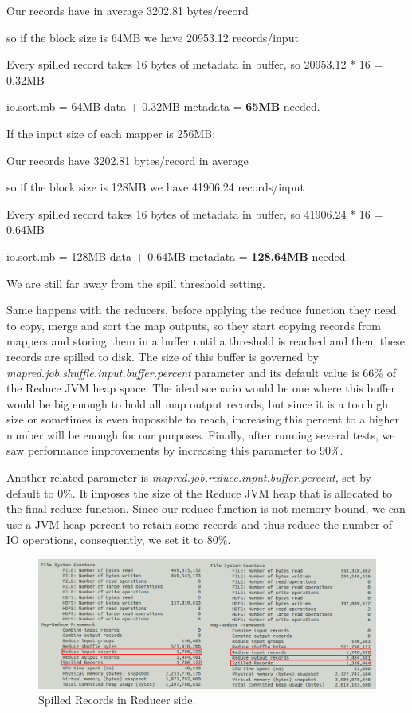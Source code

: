 \begin{itemize}
\centerline{Our records have in average 3202.81 bytes/record}
\centerline{so if the block size is 64MB we have 20953.12 records/input}
\centerline{Every spilled record takes 16 bytes of metadata in buffer, so 20953.12 * 16 = 0.32MB}
\centerline{io.sort.mb = 64MB data + 0.32MB metadata = \textbf{65MB} needed.}

\bigskip

If the input size of each mapper is 256MB:

\bigskip
\centerline{Our records have 3202.81 bytes/record in average}
\centerline{so if the block size is 128MB we have 41906.24 records/input}      
\centerline{Every spilled record takes 16 bytes of metadata in buffer, so 41906.24 * 16 = 0.64MB}
\centerline{io.sort.mb = 128MB data + 0.64MB metadata = \textbf{128.64MB} needed.}
\bigskip
\par
We are still far away from the spill threshold setting. 

\bigskip

Same happens with the reducers, before applying the reduce function they need to copy, merge and sort the map outputs, so they start copying records from mappers and storing them in a buffer until a threshold is reached and then, these records are spilled to disk. The size of this buffer is governed by \textit{mapred.job.shuffle.input.buffer.percent} parameter and its default value is 66\% of the Reduce JVM heap space. The ideal scenario would be one where this buffer would be big enough to hold all map output records, but since it is a too high size or sometimes is even impossible to reach, increasing this percent to a higher number will be enough for our purposes. Finally, after running several tests, we saw performance improvements by increasing this parameter to 90\%.
\par 
Another related parameter is \textit{mapred.job.reduce.input.buffer.percent}, set by default to 0\%. It imposes the size of the Reduce JVM heap that is allocated to the final reduce function. Since our reduce function is not memory-bound, we can use a JVM heap percent to retain some records and thus reduce the number of IO operations, consequently, we set it to 80\%.


\begin{figure}[htb]
\centering
\includegraphics[width=1\textwidth]{./images/spilledReducerRecords.png}
\caption{Spilled Records in Reducer side.} \label{fig:spilledReducerRecords}
\end{figure}


\end{itemize}
